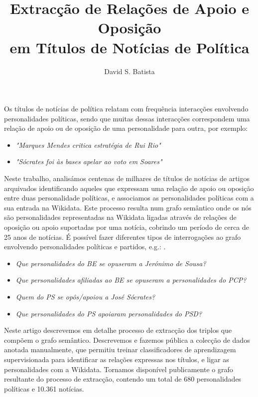 \documentclass[a4paper, twocolumn, 11pt, twoside]{article}
\title{Extracção de Relações de Apoio e Oposição \\em Títulos de Notícias de Política}
\author{
  David S. Batista \\
  \email{dsbatista@gmail.com} 
}
\begin{document}
\maketitle

\begin{resumo}
Os títulos de notícias de política relatam com frequência interacções envolvendo personalidades políticas, sendo que muitas dessas interacções correspondem uma relação de apoio ou de oposição de uma personalidade para outra, por exemplo:

\begin{itemize}
\item{\textit{"Marques Mendes critica estratégia de Rui Rio"}}
\item{\textit{"Sócrates foi às bases apelar ao voto em Soares"}}
\end{itemize}

Neste trabalho, analisámos centenas de milhares de títulos de notícias de artigos arquivados identificando aqueles que expressam uma relação de apoio ou oposição entre duas personalidade políticas, e associamos as personalidades políticas com a sua entrada na Wikidata. Este processo resulta num grafo semântico onde os nós são personalidades representadas na Wikidata ligadas através de relações de oposição ou apoio suportadas por uma notícia, cobrindo um período de cerca de 25 anos de notícias. É possível fazer diferentes tipos de interrogações ao grafo envolvendo personalidades políticas e partidos, e.g.: .

\begin{itemize}
\item{\textit{Que personalidades do BE se opuseram a Jerónimo de Sousa?}}
\item{\textit{Que personalidades afiliadas ao BE se opuseram a personalidades do PCP?}}
\item{\textit{Quem do PS se opôs/apoiou a José Sócrates?}}
\item{\textit{Que personalidades do PS apoiaram personalidades do PSD?}}
\end{itemize}

Neste artigo descrevemos em detalhe processo de extracção dos triplos que compõem o grafo semântico. Descrevemos e fazemos pública a colecção de dados anotada manualmente, que permitiu treinar classificadores de aprendizagem supervisionada para identificar as relações expressas nos títulos, e ligar as personalidades com a Wikidata. Tornamos disponível publicamente o grafo resultante do processo de extracção, contendo um total de 680 personalidades políticas e 10.361 notícias.
\end{resumo}
\end{document}
